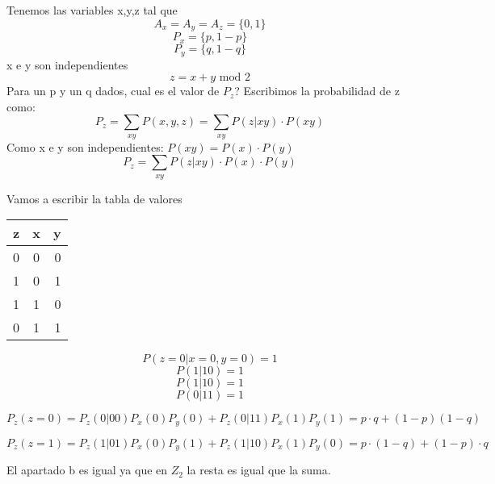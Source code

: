 \begin{problem}
	Tenemos las variables x,y,z tal que 
	$$A_x = A_y = A_z = \{0,1\}$$
	$$P_x = \{p, 1-p\}$$
	$$P_y = \{q, 1-q\}$$
	x e y son independientes
	$$z = x+y \text{ mod 2}$$
	Para un p y un q dados, cual es el valor de $P_z$?
	\solution
	Escribimos la probabilidad de z como:
	$$P_z = \sum_{xy} P(x,y,z) = \sum_{xy} P(z|xy)\cdot P(xy)$$
	Como x e y son independientes: $P(xy) = P(x)\cdot P(y)$
	$$P_z = \sum_{xy} P(z|xy)\cdot P(x)\cdot P(y)$$
	
	Vamos a escribir la tabla de valores
	\begin{center}
		
	
	\begin{tabular}{l | c | r}
	z & x & y\\
	\hline
	0 & 0 & 0\\
	1 & 0 & 1\\
	1 & 1 & 0\\
	0 & 1 & 1
	\end{tabular}
	
\end{center}

$$P(z = 0 | x= 0 , y = 0) = 1$$
$$P(1|1 0) = 1$$
$$P(1|10) = 1$$
$$P(0 |11) = 1$$

$$P_z(z=0) = P_z(0|00)P_x(0)P_y(0) + P_z(0|11)P_x(1)P_y(1) = p\cdot q + (1-p)(1-q)$$

$$P_z(z=1) = P_z(1|01)P_x(0)P_y(1) + P_z(1|10)P_x(1)P_y(0) = p\cdot (1-q) + (1-p)\cdot q$$

El apartado b es igual ya que en $Z_2$ la resta es igual que la suma.
\end{problem}

